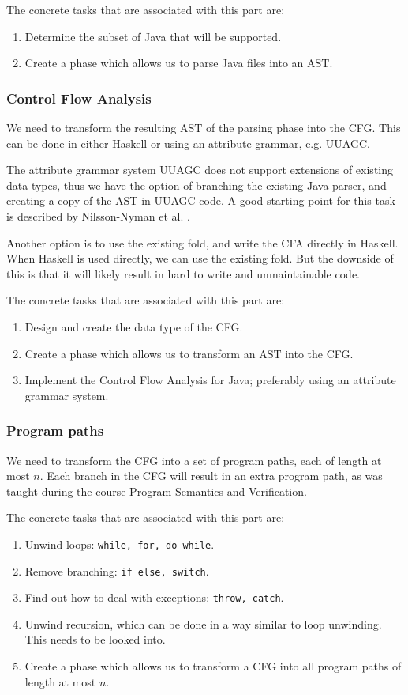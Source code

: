 \documentclass[a4paper]{article}
\begin{document}
The concrete tasks that are associated with this part are:
\begin{enumerate}
    \item Determine the subset of Java that will be supported.
    \item Create a phase which allows us to parse Java files into an AST.
\end{enumerate}

\subsubsection{Control Flow Analysis}
We need to transform the resulting AST of the parsing phase into the CFG. This
can be done in either Haskell or using an attribute grammar, e.g. UUAGC. 

The attribute grammar system UUAGC does not support extensions of existing data 
types, thus we have the option of branching the existing Java parser, and creating
a copy of the AST in UUAGC code. A good starting point for this task is described 
by Nilsson-Nyman et al. \cite{nilsson2009declarative}. 

Another option is to use the existing fold, and write the CFA directly in Haskell.
When Haskell is used directly, we can use the existing fold. But the downside of 
this is that it will likely result in hard to write and unmaintainable code. 

The concrete tasks that are associated with this part are:
\begin{enumerate}
    \item Design and create the data type of the CFG.
    \item Create a phase which allows us to transform an AST into the CFG.
    \item Implement the Control Flow Analysis for Java; preferably using an attribute
    grammar system.
\end{enumerate}

\subsubsection{Program paths}
We need to transform the CFG into a set of program paths, each of length at most 
$n$. Each branch in the CFG will result in an extra program path, as was taught 
during the course Program Semantics and Verification. 

The concrete tasks that are associated with this part are:
\begin{enumerate}
    \item Unwind loops: \texttt{while, for, do while}.
    \item Remove branching: \texttt{if else, switch}.
    \item Find out how to deal with exceptions: \texttt{throw, catch}.
    \item Unwind recursion, which can be done in a way similar to loop unwinding.
    This needs to be looked into.
    \item Create a phase which allows us to transform a CFG into all program paths
    of length at most $n$.
\end{enumerate}
\end{document}
